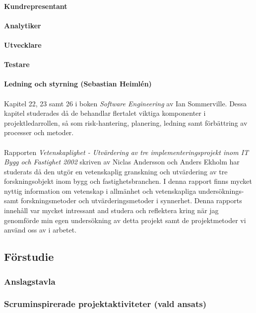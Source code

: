 \documentclass[conference]{IEEEtran}
\begin{document}
\\
\textbf{Kundrepresentant}\\
\\
\textbf{Analytiker}\\
\\
\textbf{Utvecklare}\\
\\
\textbf{Testare}\\
\\
\textbf{Ledning och styrning (Sebastian Heimlén)}\\
\\
Kapitel 22, 23 samt 26 i boken \textit{Software Engineering} av Ian Sommerville\cite{Sommerville10}. Dessa kapitel studerades då de behandlar flertalet viktiga komponenter i projektledarrollen, så som risk-hantering, planering, ledning samt förbättring av processer och metoder.\\
\\
Rapporten \textit{Vetenskaplighet - Utvärdering av tre implementeringsprojekt inom IT Bygg och Fastighet 2002} skriven av Niclas Andersson och Anders Ekholm\cite{Andersson02} har studerats då den utgör en vetenskaplig granskning och utvärdering av tre forskningsobjekt inom bygg och fastighetsbranchen. I denna rapport finns mycket nyttig information om vetenskap i allmänhet och vetenskapliga undersöknings- samt forskningsmetoder och utvärderingsmetoder i synnerhet. Denna rapports innehåll var mycket intressant and studera och reflektera kring när jag genomförde min egen undersökning av detta projekt samt de projektmetoder vi använd oss av i arbetet.
\subsection{Förstudie}

\subsubsection{Anslagstavla}

\subsubsection{Scruminspirerade projektaktiviteter (vald ansats)}
\end{document}
